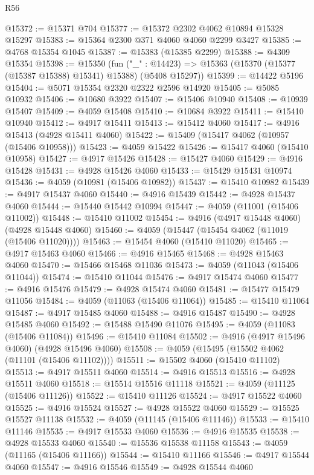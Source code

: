 \begin{lexlean}{R56}
\begin{coremodule}
@15372 := @15371 @704
@15377 := @15372 @2302 @4062 @10894 @15328 @15297
@15383 := @15364 @2300 @371 @4060 @4060 @2299 @3427
@15385 := @4768 @15354 @1045
@15387 := @15383 (@15385 @2299)
@15388 := @4309 @15354
@15398 := @15350
    (fun ("_" : @14423) => @15363 (@15370 (@15377 (@15387 @15388) @15341) @15388) (@5408 @15297))
@15399 := @14422 @5196
@15404 := @5071 @15354 @2320 @2322 @2596 @14920
@15405 := @5085 @10932
@15406 := @10680 @3922
@15407 := @15406 @10940
@15408 := @10939 @15407
@15409 := @4059 @15408
@15410 := @10684 @3922
@15411 := @15410 @10940
@15412 := @4917 @15411
@15413 := @15412 @4060
@15417 := @4916 @15413 (@4928 @15411 @4060)
@15422 := @15409 (@15417 @4062 (@10957 (@15406 @10958)))
@15423 := @4059 @15422
@15426 := @15417 @4060 (@15410 @10958)
@15427 := @4917 @15426
@15428 := @15427 @4060
@15429 := @4916 @15428
@15431 := @4928 @15426 @4060
@15433 := @15429 @15431 @10974
@15436 := @4059 (@10981 (@15406 @10982))
@15437 := @15410 @10982
@15439 := @4917 @15437 @4060
@15440 := @4916 @15439
@15442 := @4928 @15437 @4060
@15444 := @15440 @15442 @10994
@15447 := @4059 (@11001 (@15406 @11002))
@15448 := @15410 @11002
@15454 := @4916 (@4917 @15448 @4060) (@4928 @15448 @4060)
@15460 := @4059 (@15447 (@15454 @4062 (@11019 (@15406 @11020))))
@15463 := @15454 @4060 (@15410 @11020)
@15465 := @4917 @15463 @4060
@15466 := @4916 @15465
@15468 := @4928 @15463 @4060
@15470 := @15466 @15468 @11036
@15473 := @4059 (@11043 (@15406 @11044))
@15474 := @15410 @11044
@15476 := @4917 @15474 @4060
@15477 := @4916 @15476
@15479 := @4928 @15474 @4060
@15481 := @15477 @15479 @11056
@15484 := @4059 (@11063 (@15406 @11064))
@15485 := @15410 @11064
@15487 := @4917 @15485 @4060
@15488 := @4916 @15487
@15490 := @4928 @15485 @4060
@15492 := @15488 @15490 @11076
@15495 := @4059 (@11083 (@15406 @11084))
@15496 := @15410 @11084
@15502 := @4916 (@4917 @15496 @4060) (@4928 @15496 @4060)
@15508 := @4059 (@15495 (@15502 @4062 (@11101 (@15406 @11102))))
@15511 := @15502 @4060 (@15410 @11102)
@15513 := @4917 @15511 @4060
@15514 := @4916 @15513
@15516 := @4928 @15511 @4060
@15518 := @15514 @15516 @11118
@15521 := @4059 (@11125 (@15406 @11126))
@15522 := @15410 @11126
@15524 := @4917 @15522 @4060
@15525 := @4916 @15524
@15527 := @4928 @15522 @4060
@15529 := @15525 @15527 @11138
@15532 := @4059 (@11145 (@15406 @11146))
@15533 := @15410 @11146
@15535 := @4917 @15533 @4060
@15536 := @4916 @15535
@15538 := @4928 @15533 @4060
@15540 := @15536 @15538 @11158
@15543 := @4059 (@11165 (@15406 @11166))
@15544 := @15410 @11166
@15546 := @4917 @15544 @4060
@15547 := @4916 @15546
@15549 := @4928 @15544 @4060

\end{coremodule}
\end{lexlean}
